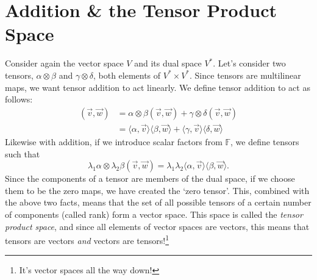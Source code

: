 \section{Addition \& the Tensor Product Space}
Consider again the vector space $V$ and its dual space $V^*$. Let's consider two tensors, $\alpha \otimes \beta$ and $\gamma \otimes \delta$, both elements of $V^* \times V^*$.
Since tensors are multilinear maps, we want tensor addition to act linearly. 
We define tensor addition to act as follows:
\begin{align*}
    [\alpha \otimes \beta + \gamma \otimes \delta](\vec{v},\vec{w}) &= \alpha\otimes\beta (\vec{v},\vec{w}) + \gamma\otimes\delta(\vec{v},\vec{w}) \\
    &= \langle \alpha, \vec{v} \rangle\langle \beta, \vec{w} \rangle + \langle \gamma, \vec{v} \rangle\langle \delta,\vec{w} \rangle
\end{align*}
Likewise with addition, if we introduce scalar factors from $\mathbb{F}$, we define tensors such that
\[\lambda_1\alpha\otimes\lambda_2\beta(\vec{v},\vec{w}) = \lambda_1\lambda_2\langle \alpha, \vec{v} \rangle\langle \beta, \vec{w} \rangle.\]
Since the components of a tensor are members of the dual space, if we choose them to be the zero maps, we have created the `zero tensor'. 
This, combined with the above two facts, means that the set of all possible tensors of a certain number of components (called rank) form a vector space. 
This space is called the \emph{tensor product space}, and since all elements of vector spaces are vectors, this means that tensors are vectors \emph{and} vectors are tensors!\footnote{It's vector spaces all the way down!}

